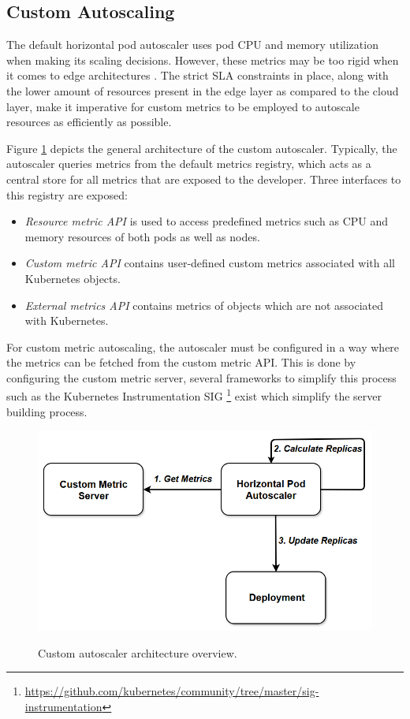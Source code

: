 \subsection{Custom Autoscaling}
\label{subsec:custom-autoscaling}

The default horizontal pod autoscaler uses pod CPU and memory utilization when making its scaling decisions. However, these metrics may be too rigid when it comes to edge architectures \cite{coulson2020adaptive}. The strict SLA constraints in place, along with the lower amount of resources present in the edge layer as compared to the cloud layer, make it imperative for custom metrics to be employed to autoscale resources as efficiently as possible.\par

Figure \ref{fig:custom-autoscale-overview} depicts the general architecture of the custom autoscaler. Typically, the autoscaler queries metrics from the default metrics registry, which acts as a central store for all metrics that are exposed to the developer. Three interfaces to this registry are exposed:
\begin{itemize}
    \item \textit{Resource metric API} is used to access predefined metrics such as CPU and memory resources of both pods as well as nodes.
    \item \textit{Custom metric API} contains user-defined custom metrics associated with all Kubernetes objects.
    \item \textit{External metrics API} contains metrics of objects which are not associated with Kubernetes.
\end{itemize}
For custom metric autoscaling, the autoscaler must be configured in a way where the metrics can be fetched from the custom metric API. This is done by configuring the custom metric server, several frameworks to simplify this process such as the Kubernetes Instrumentation SIG \footnote{\url{https://github.com/kubernetes/community/tree/master/sig-instrumentation}} exist which simplify the server building process.

\begin{figure}[htb]
    \centering
    \caption{Custom autoscaler architecture overview.}
    \includegraphics[width=.7\linewidth]{Figures/Custom-Metrics-Autoscaling.png}
    \label{fig:custom-autoscale-overview}
\end{figure}

